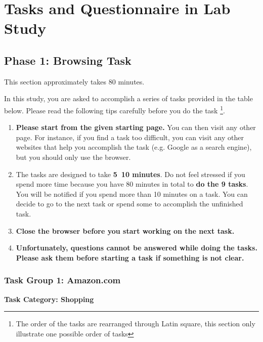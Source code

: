 \cleardoublepage

\section{Tasks and Questionnaire in Lab Study}
\label{appendix:b}

\subsection{Phase 1: Browsing Task}

This section approximately takes 80 minutes.

In this study, you are asked to accomplish a series of tasks provided in the table below.
Please read the following tips carefully before you do the task \footnote{The order of the tasks
are rearranged through Latin square, this section only illustrate one possible order of tasks}.

\begin{enumerate}
    \item \textbf{Please start from the given starting page.} You can then visit any other page. 
          For instance, if you find a task too difficult, you can visit any other websites 
          that help you accomplish the task (e.g. Google as a search engine), but you 
          should only use the browser.
    \item The tasks are designed to take \textbf{5~10 minutes}. Do not feel stressed if you spend 
          more time because you have 80 minutes in total to \textbf{do the 9 tasks}. You will 
          be notified if you spend more than 10 minutes on a task. You can decide to go to 
          the next task or spend some to accomplish the unfinished task. 
    \item \textbf{Close the browser before you start working on the next task.}
    \item \textbf{Unfortunately, questions cannot be answered while doing the tasks.
          Please ask them before starting a task if something is not clear. }
\end{enumerate}

\subsubsection{Task Group 1: Amazon.com}

\textbf{Task Category: Shopping}

